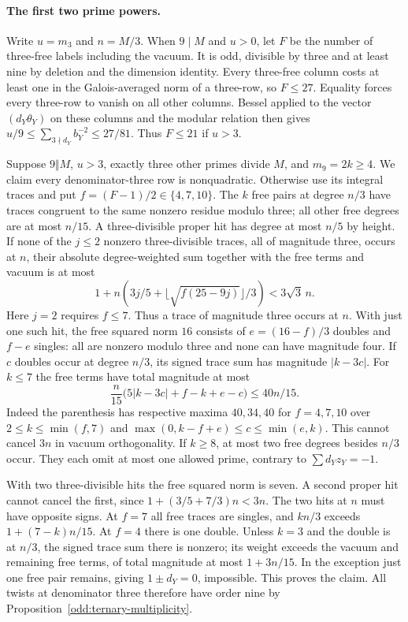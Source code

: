 \documentclass[11pt]{amsart}
\numberwithin{equation}{section}
\theoremstyle{definition}
\theoremstyle{plain}
\begin{document}
\paragraph{The first two prime powers.}
Write $u=m_3$ and $n=M/3$. When $9\mid M$ and $u>0$, let $F$
be the number of three-free labels including the vacuum.
It is odd, divisible by three and at least nine by deletion and the
dimension identity. Every three-free column costs at least one in
the Galois-averaged norm of a three-row, so $F\le27$. Equality
forces every three-row to vanish on all other columns. Bessel applied
to the vector $(d_Y\theta_Y)$ on these columns and the modular
relation then gives $u/9\le\sum_{3\nmid d_Y}b_Y^{-2}\le27/81$.
Thus $F\le21$ if $u>3$.

Suppose $9\Vert M$, $u>3$, exactly three other primes divide $M$,
and $m_9=2k\ge4$. We claim every denominator-three row is
nonquadratic. Otherwise use its integral traces and put
$f=(F-1)/2\in\{4,7,10\}$. The $k$ free pairs at degree $n/3$
have traces congruent to the same nonzero residue modulo three;
all other free degrees are at most $n/15$. A three-divisible
proper hit has degree at most $n/5$ by height. If none of the
$j\le2$ nonzero three-divisible traces, all of magnitude three,
occurs at $n$, their absolute degree-weighted sum together with
the free terms and vacuum is at most
\[
 1+n\left(3j/5+\lfloor\sqrt{f(25-9j)}\rfloor/3\right)
       <3\sqrt3\,n .
\]
Here $j=2$ requires $f\le7$. Thus a trace of magnitude three
occurs at $n$. With just one such hit, the free squared norm $16$
consists of $e=(16-f)/3$ doubles and $f-e$ singles: all are
nonzero modulo three and none can have magnitude four. If $c$
doubles occur at degree $n/3$, its signed trace sum has magnitude
$|k-3c|$. For $k\le7$ the free terms have total magnitude at most
\[
 \frac n{15}\bigl(5|k-3c|+f-k+e-c\bigr)\le40n/15 .
\]
Indeed the parenthesis has respective maxima $40,34,40$ for
$f=4,7,10$ over $2\le k\le\min(f,7)$ and
$\max(0,k-f+e)\le c\le\min(e,k)$. This cannot cancel $3n$
in vacuum orthogonality. If $k\ge8$, at most two free degrees
besides $n/3$ occur. They each omit at most one allowed prime,
contrary to $\sum d_Yz_Y=-1$.

With two three-divisible hits the free squared norm is seven.
A second proper hit cannot cancel the first, since
$1+(3/5+7/3)n<3n$. The two hits at $n$ must have opposite signs.
At $f=7$ all free traces are singles, and $kn/3$ exceeds
$1+(7-k)n/15$. At $f=4$ there is one double. Unless $k=3$ and
the double is at $n/3$, the signed trace sum there is nonzero;
its weight exceeds the vacuum and remaining free terms, of
total magnitude at most $1+3n/15$. In the exception just one
free pair remains, giving $1\pm d_Y=0$, impossible.
This proves the claim. All twists at denominator three therefore
have order nine by Proposition~\ref{odd:ternary-multiplicity}.
\end{document}
